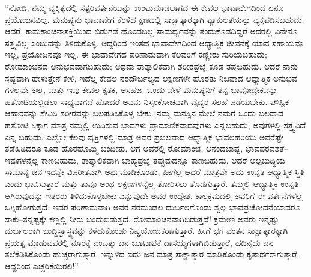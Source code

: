 “ನೋಡಿ, ನಮ್ಮ ವ್ಯಕ್ತಿತ್ವದಲ್ಲಿ ಸತ್ಪರಿವರ್ತನೆಯನ್ನು ಉಂಟುಮಾಡಲಾಗದ ಈ ಕೇವಲ ಭಾವಾವೇಗದಿಂದ ಏನೂ ಪ್ರಯೋಜನವಿಲ್ಲ. ಮನುಷ್ಯನು ಭಾವಾವೇಗ ಕೆರಳಿದ ಕ್ಷಣದಲ್ಲಿ ಸಾಕ್ಷಾತ್ಕಾರಕ್ಕಾಗಿ ವ್ಯಾಕುಲತೆಯನ್ನು ವ್ಯಕ್ತಪಡಿಸಬಹುದು. ಆದರೆ, ಕಾಮಕಾಂಚನಾಸಕ್ತಿಯಿಂದ ಬಿಡುಗಡೆ ಹೊಂದಬಲ್ಲ ಸಾಮರ್ಥ್ಯವನ್ನು ತಂದುಕೊಡದಿದ್ದರೆ ಅದರಲ್ಲಿ ಏನೇನೂ ಸತ್ತ್ವವಿಲ್ಲ ಎಂಬುದನ್ನು ತಿಳಿದುಕೊಳ್ಳಿ. ಆದ್ದರಿಂದ ಇಂತಹ ಭಾವಾವೇಗದಿಂದ ಆಧ್ಯಾತ್ಮಿಕ ಜೀವನಕ್ಕೆ ಯಾವ ಸಹಾಯವೂ ಇಲ್ಲ, ಪ್ರಯೋಜನವೂ ಇಲ್ಲ. ಈ ಭಾವಾವೇಗದ ಪರಿಣಾಮವಾಗಿ ಕೆಲವರಿಗೆ ಕಣ್ಣೀರು ಸುರಿಯಬಹುದು; ರೋಮಾಂಚನದ ಅನುಭವವಾಗಬಹುದು; ಅಥವಾ ತಾತ್ಕಾಲಿಕವಾಗಿ ಶರೀರಪ್ರಜ್ಞೆ ಕೂಡ ತಪ್ಪಬಹುದು. ಆದರೆ ನಾನು ಸ್ಪಷ್ಟವಾಗಿ ಹೇಳುತ್ತೇನೆ ಕೇಳಿ, ಇದೆಲ್ಲ ಕೇವಲ ನರದೌರ್ಬಲ್ಯದ ಲಕ್ಷಣಗಳೇ ಹೊರತು ನಿಜವಾದ ಆಧ್ಯಾತ್ಮಿಕ ಅನುಭವ ಗಳಲ್ಲವೇ ಅಲ್ಲ, ಮತ್ತು ಇವು ಕೇವಲ ಕೃತಕ, ಅಸಹಜ. ಒಂದು ವೇಳೆ ಮನುಷ್ಯನಿಗೆ ತನ್ನ ಭಾವೋದ್ರೇಕವನ್ನು ಹತೋಟಿಯಲ್ಲಿಡಲು ಸಾಧ್ಯವಾಗದೆ ಹೋದರೆ ಅವನು ನಿಸ್ಸಂಕೋಚವಾಗಿ ವೈದ್ಯರ ಸಲಹೆ ಪಡೆಯಬೇಕು. ಪೌಷ್ಟಿಕ ಆಹಾರವನ್ನು ಸೇವಿಸಿ ಶರೀರವನ್ನು ಬಲಪಡಿಸಿಕೊಳ್ಳ ಬೇಕು. ನಮ್ಮ ಮನಸ್ಸಿನ ಮೇಲೆ ನಮಗೆ ಒಂದು ಬಲವಾದ ಹತೋಟಿ ಸಿಕ್ಕಾಗ ಮಾತ್ರ ನಮ್ಮಲ್ಲಿ ಉದಿಸುವ ಭಾವಗಳು ಪ್ರಾಮಾಣಿಕವಾದವುಗಳು ಎನ್ನಬಹುದು, ಅವುಗಳಲ್ಲಿ ಸತ್ತ್ವವಿದೆ ಎನ್ನ ಬಹುದು. ಎಲ್ಲೋ ಕೆಲವು ವ್ಯಕ್ತಿಗಳಲ್ಲಿ ಮಾತ್ರ ಅವರ ಪ್ರಬಲವಾದ ಆಧ್ಯಾತ್ಮಿಕ ಭಾವಲಹರಿಯು ಅವರೆಷ್ಟೇ ತಡೆಹಿಡಿದರೂ ಕೂಡ ಹೊರಹೊಮ್ಮಿ ಬಂದೀತು. ಆಗ ಅವರಲ್ಲಿ ರೋಮಾಂಚ, ಆನಂದಬಾಷ್ಟ, ಭಾವಪರವಶತೆ–ಇವುಗಳನ್ನೆಲ್ಲ ಕಾಣಬಹುದು, ತಾತ್ಕಾಲಿಕವಾಗಿ ಬಾಹ್ಯಪ್ರಜ್ಞೆ ತಪ್ಪುವುದನ್ನೂ ಕಾಣಬಹುದು, ಆದರೆ ಅಲ್ಪಬುದ್ಧಿಯ ಸಾಮಾನ್ಯ ಜನ ಇದನ್ನೇ ವಿಪರೀತವಾಗಿ ಅರ್ಥಮಾಡಿಕೊಂಡು, ಹೀಗೆಲ್ಲ ಆದರೆ ಮಾತ್ರವೇ ಅದು ಉನ್ನತ ಆಧ್ಯಾತ್ಮಿಕ ಸ್ಥಿತಿ ಎಂದು ಭಾವಿಸುತ್ತಾರೆ ಮತ್ತು ತಾವೂ ಅಂಥ ಲಕ್ಷಣಗಳನ್ನೆಲ್ಲ ತೋರಿಸಲು ತೊಡಗುತ್ತಾರೆ. ತಮ್ಮಲ್ಲಿ ಆಧ್ಯಾತ್ಮಿಕ ಉನ್ನತಿ ಆಗಿರುವುದನ್ನು ಇತರರು ತಿಳಿದುಕೊಳ್ಳಬೇಕು ಎನ್ನುವುದೇ ಅವರ ಉದ್ದೇಶ. ಕಾಲಕ್ರಮದಲ್ಲಿ ಅವರಿಗೆ ಈ ವರ್ತನೆಗಳೆಲ್ಲ ಒಗ್ಗಿಹೋಗುತ್ತದೆ; ಇದರ ಪರಿಣಾಮವಾಗಿ ಅವರ ನರಮಂಡಲ ದುರ್ಬಲಗೊಂಡು ಸ್ವಲ್ಪ ಭಾವಪ್ರಚೋದನೆಯಾದರೂ ಸಾಕು–ತನ್ನಷ್ಟಕ್ಕೇ ಕಣ್ಣಲ್ಲಿ ನೀರು ಬಂದುಬಿಡುತ್ತದೆ, ರೋಮಾಂಚನವಾಗಿಬಿಡುತ್ತದೆ! ಕ್ರಮೇಣ ಅವರು ಇನ್ನಷ್ಟು ದುರ್ಬಲರಾಗಿ ಬುದ್ಧಿಸ್ವಾಸ್ಥ್ಯವನ್ನು ಕಳೆದುಕೊಂಡು ನಿಷ್ಪ್ರಯೋಜಕರಾಗುತ್ತಾರೆ. ಹೀಗೆ ಭಗ ವಂತನ ಸಾಕ್ಷಾತ್ಕಾರಕ್ಕಾಗಿ ಪ್ರಯತ್ನ ಮಾಡುವವರಲ್ಲಿ ನೂರಕ್ಕೆ ಎಂಬತ್ತು ಜನ ಬೂಟಾಟಿಕೆ ದಾಸಯ್ಯಗಳಾಗಿಬಿಡುತ್ತಾರೆ, ಹದಿನೈದು ಜನ ತಲೆಕೆಡಿಸಿಕೊಂಡು ಹುಚ್ಚರಾಗುತ್ತಾರೆ. ಇನ್ನುಳಿದ ಐದು ಜನ ಮಾತ್ರ ಸಾಕ್ಷಾತ್ಕಾರ ಮಾಡಿಕೊಂಡು ಕೃತಾರ್ಥರಾಗುತ್ತಾರೆ, ಆದ್ದರಿಂದ ಎಚ್ಚರಿಕೆಯಿರಲಿ!”

